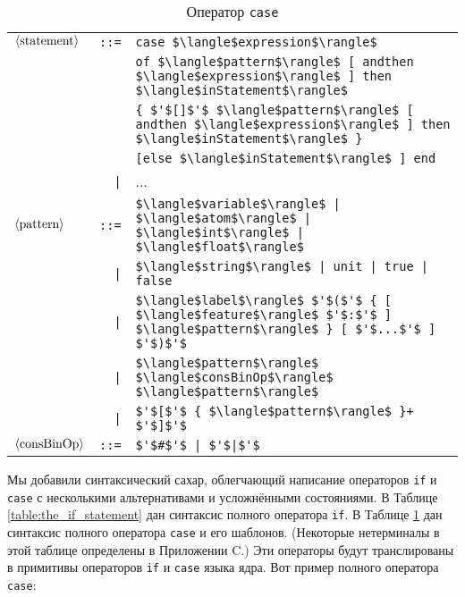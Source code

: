 \begin{table}
  \begin{tabular}{|lrl|}
    \hline
    $\langle \text{\lstinline|statement|} \rangle$ & \lstinline|::=| & \lstinline|case $\langle$expression$\rangle$|\\
    & & \lstinline|of $\langle$pattern$\rangle$ [ andthen $\langle$expression$\rangle$ ] then $\langle$inStatement$\rangle$| \\
    & & \lstinline|{ $'$[]$'$ $\langle$pattern$\rangle$ [ andthen $\langle$expression$\rangle$ ] then $\langle$inStatement$\rangle$ }| \\
    &  & \lstinline|[else $\langle$inStatement$\rangle$ ] end| \\
    & \lstinline!|! & ... \\
    $\langle \text{\lstinline|pattern|} \rangle$ & \lstinline|::=| & \lstinline!$\langle$variable$\rangle$ | $\langle$atom$\rangle$ | $\langle$int$\rangle$ | $\langle$float$\rangle$!\\
    & \lstinline!|! & \lstinline!$\langle$string$\rangle$ | unit | true | false! \\
    & \lstinline!|! & \lstinline!$\langle$label$\rangle$ $'$($'$ { [ $\langle$feature$\rangle$ $'$:$'$ ] $\langle$pattern$\rangle$ } [ $'$...$'$ ] $'$)$'$! \\
    & \lstinline!|! & \lstinline|$\langle$pattern$\rangle$ $\langle$consBinOp$\rangle$ $\langle$pattern$\rangle$| \\
    & \lstinline!|! & \lstinline|$'$[$'$ { $\langle$pattern$\rangle$ }+ $'$]$'$| \\
    $\langle \text{\lstinline|consBinOp|} \rangle$ & \lstinline|::=| & \lstinline!$'$#$'$ | $'$|$'$! \\
    \hline
  \end{tabular}
  
\caption{Оператор \lstinline|case|}
\label{table:the_case_statement}
\end{table}

Мы добавили синтаксический сахар, облегчающий написание операторов \lstinline|if| и \lstinline|case| с несколькими альтернативами и усложнёнными состояниями. В Таблице \ref{table:the_if_statement} дан синтаксис полного оператора \lstinline|if|. В Таблице \ref{table:the_case_statement} дан синтаксис полного оператора \lstinline|case| и его шаблонов. (Некоторые нетерминалы в этой таблице определены в Приложении C.) Эти операторы будут транслированы в примитивы операторов \lstinline|if| и \lstinline|case| языка ядра. Вот пример полного оператора \lstinline|case|:

